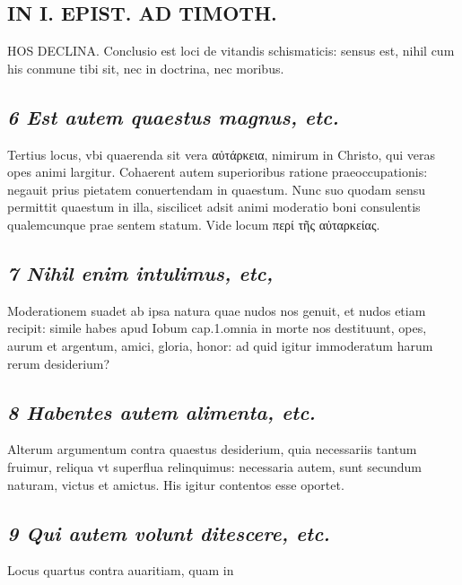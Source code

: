 \documentclass{article}
\begin{document}
\begin{pages}
\section*{IN I. EPIST. AD TIMOTH. }
\marginpar{[ p.155 ]}\pstart HOS DECLINA. Conclusio est loci de vitandis schismaticis: sensus est, nihil cum his conmune tibi sit, nec in doctrina, nec moribus.  \pend
{}
{}
\subsection*{\textit{6 Est autem quaestus magnus, etc. }}\pstart Tertius locus, vbi quaerenda sit vera αὐτάρκεια, nimirum in Christo, qui veras opes animi largitur. Cohaerent autem superioribus ratione praeoccupationis: negauit prius pietatem conuertendam in quaestum. Nunc suo quodam sensu permittit quaestum in illa, siscilicet adsit animi moderatio boni consulentis qualemcunque prae sentem statum. Vide locum περί τῆς αὐταρκείας.  \pend
{}
{}
\subsection*{\textit{7 Nihil enim intulimus, etc, }}\pstart Moderationem suadet ab ipsa natura quae nudos nos genuit, et nudos etiam recipit: simile habes apud Iobum cap.1.omnia in morte nos destituunt, opes, aurum et argentum, amici, gloria, honor: ad quid igitur immoderatum harum rerum desiderium?  \pend
{}
{}
\subsection*{\textit{8 Habentes autem alimenta, etc. }}\pstart Alterum argumentum contra quaestus desiderium, quia necessariis tantum fruimur, reliqua vt superflua relinquimus: necessaria autem, sunt secundum naturam, victus et amictus. His igitur contentos esse oportet.  \pend
{}
{}
\subsection*{\textit{9 Qui autem volunt ditescere, etc. }}\pstart Locus quartus contra auaritiam, quam in  \pend

\end{pages}
\end{document}
